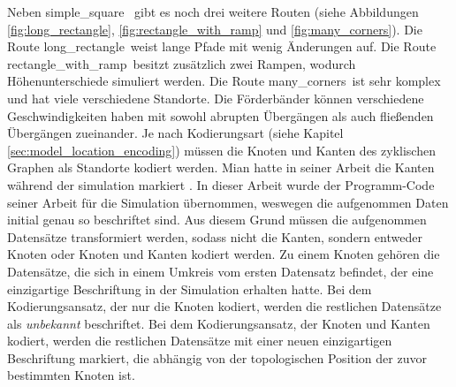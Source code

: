 \newpage
Neben \glqq simple\_square \grqq\ gibt es noch drei weitere Routen (siehe Abbildungen \ref{fig:long_rectangle}, \ref{fig:rectangle_with_ramp} und \ref{fig:many_corners}).
Die Route \glqq long\_rectangle\grqq\ weist lange Pfade mit wenig Änderungen auf.
Die Route \glqq rectangle\_with\_ramp\grqq\ besitzt zusätzlich zwei Rampen, wodurch Höhenunterschiede simuliert werden.
Die Route \glqq many\_corners\grqq\ ist sehr komplex und hat viele verschiedene Standorte.
Die Förderbänder können verschiedene Geschwindigkeiten haben mit sowohl abrupten Übergängen als auch fließenden Übergängen zueinander.
\newline
\newline
Je nach Kodierungsart (siehe Kapitel \ref{sec:model_location_encoding}) müssen die Knoten und Kanten des zyklischen Graphen als Standorte kodiert werden.
Mian hatte in seiner Arbeit die Kanten während der simulation markiert \cite{naveedThesis}.
In dieser Arbeit wurde der Programm-Code seiner Arbeit für die Simulation übernommen, weswegen die aufgenommen Daten initial genau so beschriftet sind.
Aus diesem Grund müssen die aufgenommen Datensätze transformiert werden, sodass nicht die Kanten, sondern entweder Knoten oder Knoten und Kanten kodiert werden.
Zu einem Knoten gehören die Datensätze, die sich in einem Umkreis vom ersten Datensatz befindet, der eine einzigartige Beschriftung in der Simulation erhalten hatte.
Bei dem Kodierungsansatz, der nur die Knoten kodiert, werden die restlichen Datensätze als \textit{unbekannt} beschriftet.
Bei dem Kodierungsansatz, der Knoten und Kanten kodiert, werden die restlichen Datensätze mit einer neuen einzigartigen Beschriftung markiert, die abhängig von der
topologischen Position der zuvor bestimmten Knoten ist.
